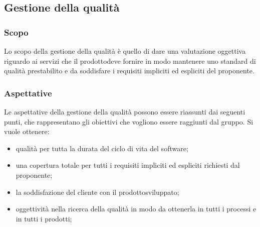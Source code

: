 \subsection{Gestione della qualità}
\subsubsection{Scopo}
Lo scopo della gestione della qualità è quello di dare una valutazione oggettiva riguardo ai servizi che il prodotto\glosp deve fornire in modo mantenere uno standard di qualità prestabilito e da soddisfare i requisiti impliciti ed espliciti del proponente.
\subsubsection{Aspettative}
Le aspettative della gestione della qualità possono essere riassunti dai seguenti punti, che rappresentano gli obiettivi che vogliono essere raggiunti dal gruppo. Si vuole ottenere:
\begin{itemize}
	\item qualità per tutta la durata del ciclo di vita del software;
	\item una copertura totale per tutti i requisiti impliciti ed espliciti richiesti dal proponente;
	\item la soddisfazione del cliente con il prodotto\glosp sviluppato;
	\item oggettività nella ricerca della qualità in modo da ottenerla in tutti i processi e in tutti i prodotti\glo;
\end{itemize}
